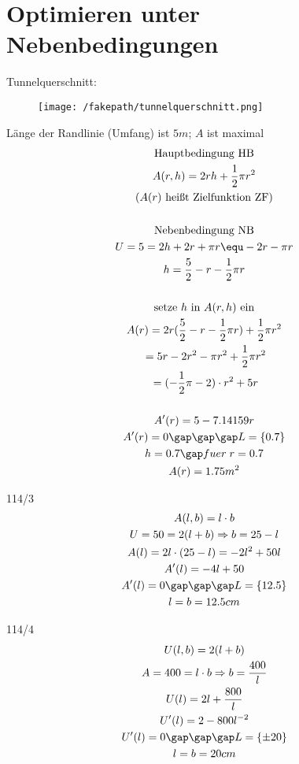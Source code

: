 \section{Optimieren unter Nebenbedingungen}
Tunnelquerschnitt:
\begin{figure}[H]
  \centering
  \texttt{[image: /fakepath/tunnelquerschnitt.png]}
\end{figure}
Länge der Randlinie (Umfang) ist $5m$; $A$ ist maximal
\begin{gather*}
  \text{Hauptbedingung HB} \\
  A(r, h) = 2rh + \frac{1}{2}\pi r^2 \\
  \text{($A(r)$ heißt Zielfunktion ZF)} \\\\
  \text{Nebenbedingung NB} \\
  U = 5 = 2h + 2r + \pi r \equ -2r - \pi r \\
  h = \frac{5}{2} - r - \frac{1}{2}\pi r \\\\
  \text{setze $h$ in $A(r, h)$ ein} \\
  A(r) = 2r(\frac{5}{2} - r - \frac{1}{2}\pi r) + \frac{1}{2}\pi r^2 \\
  \;= 5r - 2r^2 - \pi r^2 + \frac{1}{2}\pi r^2 \\
  \;= (-\frac{1}{2}\pi - 2) \cdot r^2 + 5r \\\\
  A'(r) = 5 - 7.14159r \\
  A'(r) = 0 \gap\gap\gap L = \{0.7\} \\
  h = 0.7 \gap fuer \; r = 0.7 \\
  A(r) = 1.75m^2
\end{gather*}
\begin{exercise}{114/3}
  \begin{gather*}
    A(l, b) = l \cdot b \\
    U = 50 = 2(l + b) \Rightarrow b = 25 - l \\
    A(l) = 2l \cdot (25 - l) = -2l^2 + 50l \\
    A'(l) = -4l + 50 \\
    A'(l) = 0 \gap\gap\gap L = \{12.5\} \\
    l = b = 12.5cm
  \end{gather*}
\end{exercise}
\begin{exercise}{114/4}
  \begin{gather*}
    U(l, b) = 2(l + b) \\
    A = 400 = l \cdot b \Rightarrow b = \frac{400}{l} \\
    U(l) = 2l + \frac{800}{l} \\
    U'(l) = 2 - 800l^{-2} \\
    U'(l) = 0 \gap\gap\gap L = \{\pm 20\} \\
    l = b = 20cm
  \end{gather*}
\end{exercise}
